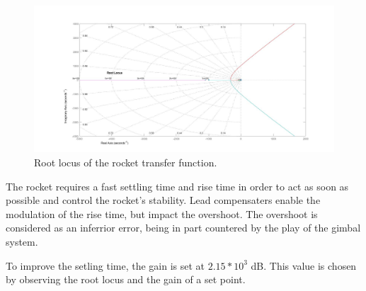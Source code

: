 \begin{figure}[htbp]
	\centering
	
		\includegraphics[width=\textwidth]{figures/Rocket/design/tf_with_controller_1}
		\caption{Root locus of the rocket transfer function.}
		\label{fig:SystemC1C2}
		
\end{figure}

The rocket requires a fast settling time and rise time in order to act as soon as possible and control the rocket's stability. Lead compensaters enable the modulation of the rise time, but impact the overshoot. The overshoot is considered as an inferrior error, being in part countered by the play of the gimbal system. 

To improve the setling time, the gain is set at $2.15 * 10^3$ \si{\dB}. This value is chosen by observing the root locus and the gain of a set point.

